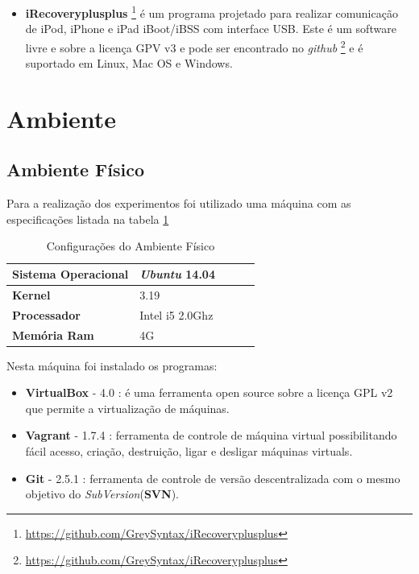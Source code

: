 \begin{itemize}
    \item \textbf{iRecoveryplusplus}
\footnote{\url{https://github.com/GreySyntax/iRecoveryplusplus}} é um programa projetado para
 realizar comunicação de iPod, iPhone e iPad iBoot/iBSS  com interface USB. 
Este é um software livre e sobre a licença GPV v3 e pode ser encontrado no \textit{github}
\footnote{\url{https://github.com/GreySyntax/iRecoveryplusplus}} e é suportado em Linux, Mac OS e Windows.

\end{itemize}




\section{Ambiente}

\subsection{Ambiente Físico}
Para a realização dos experimentos foi utilizado uma máquina com as
 especificações listada na tabela \ref{configuracoes_ambiente_fisico}

\begin{table}[h]
\centering
\begin{tabular}{lllll}
\textbf{Sistema Operacional} & \textit{Ubuntu} 14.04 \\ \toprule
\textbf{Kernel} & 3.19  \\ \midrule 
\textbf{Processador} & Intel i5 2.0Ghz \\ \midrule
\textbf{Memória Ram} & 4G  \\ \bottomrule 
\end{tabular} 
\caption{Configurações do Ambiente Físico}
\label{configuracoes_ambiente_fisico}
\end{table}


Nesta máquina foi instalado os programas:

\begin{itemize}
    \item \textbf{VirtualBox} - 4.0 : é uma ferramenta open source sobre a
 licença GPL v2 que permite a virtualização de máquinas.
    \item \textbf{Vagrant} - 1.7.4 : ferramenta de controle de
 máquina virtual possibilitando fácil acesso, criação, destruição, ligar e 
desligar máquinas virtuals.
    \item \textbf{Git} - 2.5.1 : ferramenta de controle de versão descentralizada
com o mesmo objetivo do \textit{SubVersion}(\textbf{SVN}).
\end{itemize}

